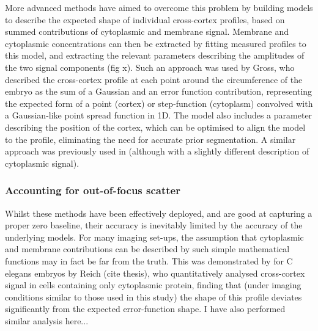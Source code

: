 \documentclass[12pt]{"article"}
\begin{document}
More advanced methods have aimed to overcome this problem by building models to describe the expected shape of individual cross-cortex profiles, based on summed contributions of cytoplasmic and membrane signal. Membrane and cytoplasmic concentrations can then be extracted by fitting measured profiles to this model, and extracting the relevant parameters describing the amplitudes of the two signal components (fig x). Such an approach was used by Gross, who described the cross-cortex profile at each point around the circumference of the embryo as the sum of a Gaussian and an error function contribution, representing the expected form of a point (cortex) or step-function (cytoplasm) convolved with a Gaussian-like point spread function in 1D. The model also includes a parameter describing the position of the cortex, which can be optimised to align the model to the profile, eliminating the need for accurate prior segmentation. A similar approach was previously used in \textcite{Blanchoud2015} (although with a slightly different description of cytoplasmic signal).\\

\subsubsection{Accounting for out-of-focus scatter}

Whilst these methods have been effectively deployed, and are good at capturing a proper zero baseline, their accuracy is inevitably limited by the accuracy of the underlying models. For many imaging set-ups, the assumption that cytoplasmic and membrane contributions can be described by such simple mathematical functions may in fact be far from the truth. This was demonstrated by for C elegans embryos by Reich (cite thesis), who quantitatively analysed cross-cortex signal in cells containing only cytoplasmic protein, finding that (under imaging conditions similar to those used in this study) the shape of this profile deviates significantly from the expected error-function shape. I have also performed similar analysis here...\\



\end{document}
